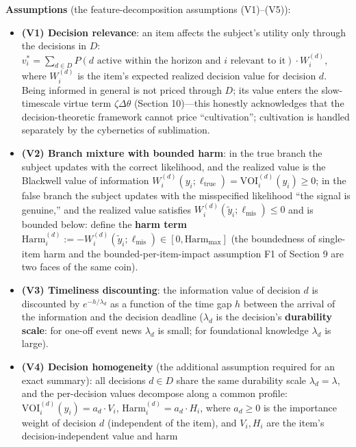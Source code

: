 \documentclass[
  11pt]{article}
\providecommand{\tightlist}{%
  \setlength{\itemsep}{0pt}\setlength{\parskip}{0pt}}
\begin{document}
\textbf{Assumptions} (the feature-decomposition assumptions (V1)--(V5)):

\begin{itemize}
\tightlist
\item
  \textbf{(V1) Decision relevance}: an item affects the subject's
  utility only through the decisions in \(D\):
  \(v_i^* = \sum_{d \in D} P(d \text{ active within the horizon and } i \text{ relevant to it}) \cdot W_i^{(d)}\),
  where \(W_i^{(d)}\) is the item's expected realized decision value for
  decision \(d\). Being informed in general is not priced through \(D\);
  its value enters the slow-timescale virtue term \(\zeta \Delta\theta\)
  (Section 10)---this honestly acknowledges that the decision-theoretic
  framework cannot price ``cultivation''; cultivation is handled
  separately by the cybernetics of sublimation.
\item
  \textbf{(V2) Branch mixture with bounded harm}: in the true branch the
  subject updates with the correct likelihood, and the realized value is
  the Blackwell value of information
  \(W_i^{(d)}(y_i;\ell_{\mathrm{true}}) = \mathrm{VOI}_i^{(d)}(y_i) \ge 0\);
  in the false branch the subject updates with the misspecified
  likelihood ``the signal is genuine,'' and the realized value satisfies
  \(W_i^{(d)}(\tilde y_i;\ell_{\mathrm{mis}}) \le 0\) and is bounded
  below: define the \textbf{harm term}
  \(\mathrm{Harm}_i^{(d)} := -W_i^{(d)}(\tilde y_i;\ell_{\mathrm{mis}}) \in [0, \mathrm{Harm}_{\max}]\)
  (the boundedness of single-item harm and the bounded-per-item-impact
  assumption F1 of Section 9 are two faces of the same coin).
\item
  \textbf{(V3) Timeliness discounting}: the information value of
  decision \(d\) is discounted by \(e^{-h/\lambda_d}\) as a function of
  the time gap \(h\) between the arrival of the information and the
  decision deadline (\(\lambda_d\) is the decision's \textbf{durability
  scale}: for one-off event news \(\lambda_d\) is small; for
  foundational knowledge \(\lambda_d\) is large).
\item
  \textbf{(V4) Decision homogeneity} (the additional assumption required
  for an exact summary): all decisions \(d \in D\) share the same
  durability scale \(\lambda_d = \lambda\), and the per-decision values
  decompose along a common profile:
  \(\mathrm{VOI}_i^{(d)}(y_i) = a_d \cdot V_i\),
  \(\mathrm{Harm}_i^{(d)} = a_d \cdot H_i\), where \(a_d \ge 0\) is the
  importance weight of decision \(d\) (independent of the item), and
  \(V_i, H_i\) are the item's decision-independent value and harm

\end{itemize}
\end{document}
